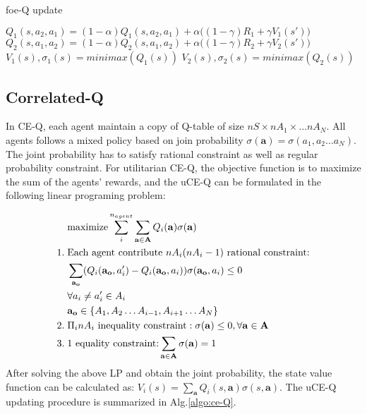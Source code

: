 \documentclass[conference]{IEEEtran}
\begin{document}
\begin{algorithm}[h!]
	\caption{foe-Q update}
	\begin{algorithmic}
		\State $Q_1(s, a_2, a_1) = (1-\alpha) Q_1(s, a_2, a_1) + \alpha  \big( (1-\gamma) R_1 + \gamma V_1(s') \big)$
		\State $Q_2(s, a_1, a_2) = (1-\alpha) Q_2(s, a_1, a_2) + \alpha  \big( (1-\gamma) R_2 + \gamma V_2(s') \big)$
		\State $V_1(s), \sigma_1(s) = minimax(Q_1(s))$
		\State $V_2(s), \sigma_2(s) = minimax(Q_2(s))$
		\EndFunction
	\end{algorithmic}
	\label{algo:foe-Q}
\end{algorithm}

\subsection{Correlated-Q}
In CE-Q, each agent maintain a copy of Q-table of size $nS\times nA_1 \times\dots nA_N$. All agents follows a mixed policy based on join probability $\sigma(\mathbf{a}) = \sigma(a_1, a_2 \dots a_N)$. The joint probability has to satisfy rational constraint as well as regular probability constraint. For utilitarian CE-Q, the objective function is to maximize the sum of the agents’ rewards, and the uCE-Q can be formulated in the following linear programing problem:

\begin{align}
&\text{maximize} \sum_i^{n_{agent}} \sum_{\mathbf{a}\in\mathbf{A}} Q_i(\mathbf{a}) \sigma(\mathbf{a}) \notag \\
1.\; & \text{Each agent contribute $nA_i(nA_i-1)$ rational constraint:} \notag\\
& \sum_{\mathbf{a_o}} (Q_i(\mathbf{a_o}, a_i') - Q_i(\mathbf{a_o}, a_i) ) \sigma(\mathbf{a_o}, a_i) \le 0 \notag \\
& \forall a_i\neq a_i' \in A_i  \notag \\
& \mathbf{a_o} \in \{ A_1, A_2 \dots A_{i-1}, A_{i+1} \dots A_{N} \} \notag \\
2.\; & \text{$\Pi_i  nA_i$ inequality constraint}: \sigma(\mathbf{a})\le 0,  \forall \mathbf{a}\in\mathbf{A}\notag \\
3.\; &\text{1 equality constraint:} \sum_{\mathbf{a}\in\mathbf{A}} \sigma(\mathbf{a}) = 1
\end{align}
After solving the above LP and obtain the joint probability, the state value function can be calculated as: $V_i(s) = \sum_{\mathbf{a}} Q_i(s, \mathbf{a}) \sigma(s, \mathbf{a})$. The uCE-Q updating procedure is summarized in Alg.\ref{algo:ce-Q}.
\end{document}
